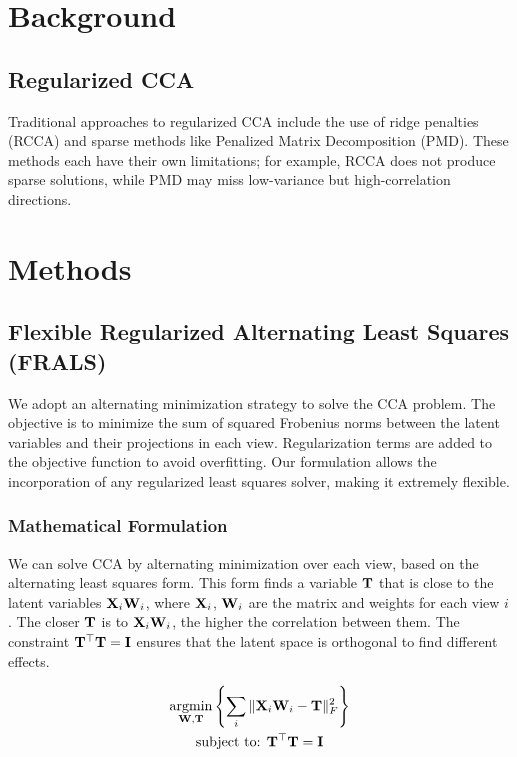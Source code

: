 \section{Background}\label{sec:background}

\subsection{Regularized CCA}\label{subsec:regularized-cca}
Traditional approaches to regularized CCA include the use of ridge penalties (RCCA) and sparse methods like Penalized Matrix Decomposition (PMD). These methods each have their own limitations; for example, RCCA does not produce sparse solutions, while PMD may miss low-variance but high-correlation directions.

\section{Methods}\label{sec:methods}

\subsection{Flexible Regularized Alternating Least Squares (FRALS)}\label{subsec:flexible-regularized-alternating-least-squares-(frals)}
We adopt an alternating minimization strategy to solve the CCA problem.
The objective is to minimize the sum of squared Frobenius norms between the latent variables and their projections in each view.
Regularization terms are added to the objective function to avoid overfitting.
Our formulation allows the incorporation of any regularized least squares solver, making it extremely flexible.

\subsubsection{Mathematical Formulation}
We can solve CCA by alternating minimization over each view, based on the alternating least squares form.
This form finds a variable $\bold{T}$ that is close to the latent variables $\bold{X}_i\bold{W}_i$, where $\bold{X}_i$, $\bold{W}_i$ are the matrix and weights for each view $i$.
The closer $\bold{T}$ is to $\bold{X}_i\bold{W}_i$, the higher the correlation between them.
The constraint  $\bold{T^{\top}T}=\bold{I}$ ensures that the latent space is orthogonal to find different effects.

\begin{gather*}
    \underset{\bold{W},\bold{T}}{\mathrm{argmin}}\left\{\sum_i \|\bold{X}_i\bold{W}_i-\bold{T}\|_{F}^2 \right\}\\
    \text{subject to: } \bold{T^{\top}T}=\bold{I}\\
\end{gather*}

